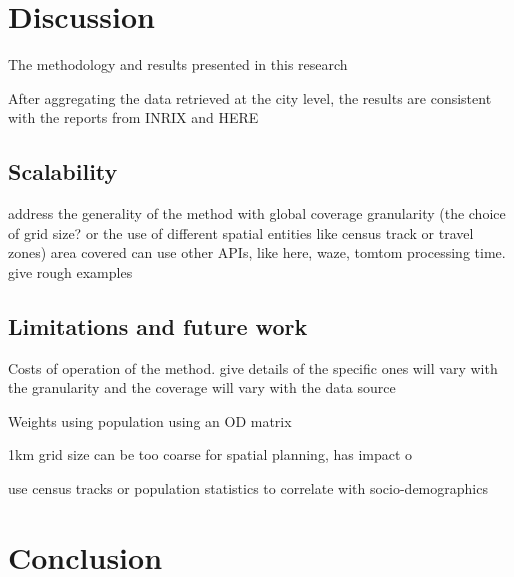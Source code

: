 \documentclass[a4paper]{jpconf}
\begin{document}
\section{Discussion}
\indent The methodology and results presented in this research 

\indent After aggregating the data retrieved at the city level, the results are consistent with the reports from INRIX and HERE 

\subsection{Scalability}
address the generality of the method with global coverage
granularity (the choice of grid size? or the use of different spatial entities like census track or travel zones)
area covered
can use other APIs, like here, waze, tomtom
processing time. give rough examples

\subsection{Limitations and future work}
\indent Costs of operation of the method.
give details of the specific ones
will vary with the granularity and the coverage
will vary with the data source

\indent Weights
using population
using an OD matrix

1km grid size can be too coarse for spatial planning, has impact o

\indent use census tracks or population statistics to correlate with socio-demographics

\section{Conclusion}
\end{document}
